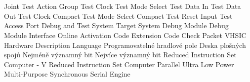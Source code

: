 \cleardoublepage
\chapter*{\listofabbrevname}
{}

\begin{acronym}[KolikMista]

		{Joint Test Action Group}
		{Test Clock}
		{Test Mode Select}
		{Test Data In}
		{Test Data Out}
		{Test Clock Compact}
		{Test Mode Select Compact}
		{Test Reset Input}
		{Test Access Port}
		{Debug and Test System}
		{Target System}
		{Debug Module}
		{Debug Module Interface}
		{Online Activation Code}	
		{Extension Code}
		{Check Packet}
		{VHSIC Hardware Description Language}
		{Programovatelné hradlové pole}
		{Deska plošných spojů}
		{Nejméně významný bit}
		{Nejvíce významný bit}
		{Reduced Instruction Set Computer - V}
		{Reduced Instruction Set Computer}
		{Parallel Ultra Low Power}
		{Multi-Purpose Synchronous Serial Engine}
\end{acronym}
